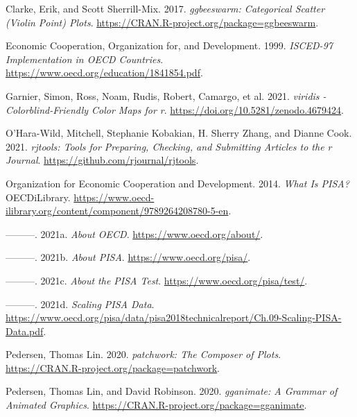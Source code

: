 \hypertarget{refs}{}
\begin{CSLReferences}{1}{0}
\leavevmode{}%
Clarke, Erik, and Scott Sherrill-Mix. 2017. \emph{{ggbeeswarm}: Categorical Scatter (Violin Point) Plots}. \url{https://CRAN.R-project.org/package=ggbeeswarm}.

\leavevmode{}%
Economic Cooperation, Organization for, and Development. 1999. \emph{ISCED-97 Implementation in OECD Countries}. \url{https://www.oecd.org/education/1841854.pdf}.

\leavevmode{}%
Garnier, Simon, Ross, Noam, Rudis, Robert, Camargo, et al. 2021. \emph{{viridis} - Colorblind-Friendly Color Maps for r}. \url{https://doi.org/10.5281/zenodo.4679424}.

\leavevmode{}%
O'Hara-Wild, Mitchell, Stephanie Kobakian, H. Sherry Zhang, and Dianne Cook. 2021. \emph{{rjtools}: Tools for Preparing, Checking, and Submitting Articles to the r Journal}. \url{https://github.com/rjournal/rjtools}.

\leavevmode{}%
Organization for Economic Cooperation and Development. 2014. \emph{What Is PISA?} OECDiLibrary. \url{https://www.oecd-ilibrary.org/content/component/9789264208780-5-en}.

\leavevmode{}%
---------. 2021a. \emph{About OECD}. \url{https://www.oecd.org/about/}.

\leavevmode{}%
---------. 2021b. \emph{About PISA}. \url{https://www.oecd.org/pisa/}.

\leavevmode{}%
---------. 2021c. \emph{About the PISA Test}. \url{https://www.oecd.org/pisa/test/}.

\leavevmode{}%
---------. 2021d. \emph{Scaling PISA Data}. \url{https://www.oecd.org/pisa/data/pisa2018technicalreport/Ch.09-Scaling-PISA-Data.pdf}.

\leavevmode{}%
Pedersen, Thomas Lin. 2020. \emph{{patchwork}: The Composer of Plots}. \url{https://CRAN.R-project.org/package=patchwork}.

\leavevmode{}%
Pedersen, Thomas Lin, and David Robinson. 2020. \emph{{gganimate}: A Grammar of Animated Graphics}. \url{https://CRAN.R-project.org/package=gganimate}.


\end{CSLReferences}
